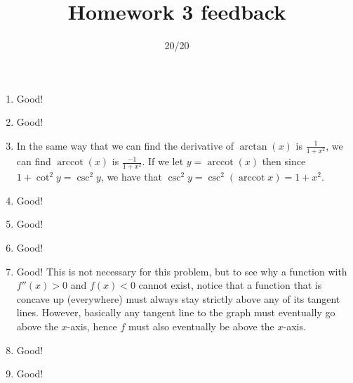 \documentclass{article}
\title{Homework 3 feedback}
\author{20/20}
\date{}
\begin{document}
\maketitle
\begin{enumerate}
	\item Good!
	\item Good!
	\item In the same way that we can find the derivative of $\operatorname{arctan}(x)$ is $\frac{1}{1+x^{2}}$, we can find $\operatorname{arccot}(x)$ is $\frac{-1}{1+x^{2}}$. If we let $y = \operatorname{arccot}(x)$ then since $1 + \cot^{2} y = \csc^{2}y$, we have that $\csc^{2} y = \csc^{2}(\operatorname{arccot} x) = 1 + x^{2}$.
	\item Good!
	\item Good!
	\item Good!
	\item Good! This is not necessary for this problem, but to see why a function with $f''(x) > 0$ and $f(x) < 0$ cannot exist, notice that a function that is concave up (everywhere) must always stay strictly above any of its tangent lines. However, basically any tangent line to the graph must eventually go above the $x$-axis, hence $f$ must also eventually be above the $x$-axis.
	\item Good!
	\item Good!
\end{enumerate}
\end{document}
